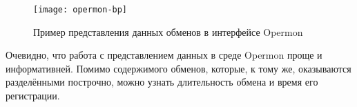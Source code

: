 \begin{figure}[H]
 \centering
 \texttt{[image: opermon-bp]}
 \caption{Пример представления данных обменов в интерфейсе Opermon}
 \label{fig:opermon-bp}
\end{figure}

Очевидно, что работа с представлением данных в среде Opermon проще и информативней. Помимо содержимого обменов, которые, к тому же, оказываются разделёнными построчно, можно узнать длительность обмена и время его регистрации.
